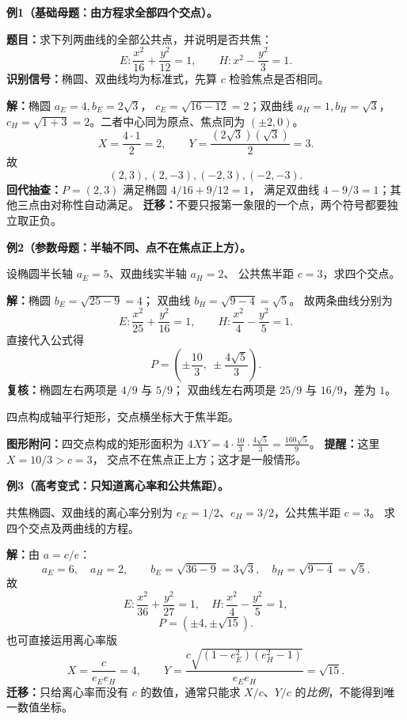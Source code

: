 \clearpage
\begin{examplebox}
\textbf{例1（基础母题：由方程求全部四个交点）。}

\textbf{题目：}求下列两曲线的全部公共点，并说明是否共焦：
\[
E:\frac{x^2}{16}+\frac{y^2}{12}=1,
\qquad H:x^2-\frac{y^2}{3}=1.
\]
\textbf{识别信号：}椭圆、双曲线均为标准式，先算 $c$ 检验焦点是否相同。

\textbf{解：}椭圆 $a_E=4,b_E=2\sqrt3$，
$c_E=\sqrt{16-12}=2$；双曲线 $a_H=1,b_H=\sqrt3$，
$c_H=\sqrt{1+3}=2$。二者中心同为原点、焦点同为 $(\pm2,0)$。
\[
X=\frac{4\cdot1}{2}=2,\qquad
Y=\frac{(2\sqrt3)(\sqrt3)}2=3.
\]
故
\[
\boxed{(2,3),(2,-3),(-2,3),(-2,-3)}.
\]
\textbf{回代抽查：}$P=(2,3)$ 满足椭圆 $4/16+9/12=1$，
满足双曲线 $4-9/3=1$；其他三点由对称性自动满足。
\textbf{迁移：}不要只报第一象限的一个点，两个符号都要独立取正负。
\end{examplebox}

\clearpage
\begin{examplebox}
\textbf{例2（参数母题：半轴不同、点不在焦点正上方）。}

设椭圆半长轴 $a_E=5$、双曲线实半轴 $a_H=2$、
公共焦半距 $c=3$，求四个交点。

\textbf{解：}椭圆 $b_E=\sqrt{25-9}=4$；
双曲线 $b_H=\sqrt{9-4}=\sqrt5$。
故两条曲线分别为
\[
E:\frac{x^2}{25}+\frac{y^2}{16}=1,
\qquad H:\frac{x^2}{4}-\frac{y^2}{5}=1.
\]
直接代入公式得
\[
\boxed{P=\left(\pm\frac{10}{3},\ \pm\frac{4\sqrt5}{3}\right)}.
\]
\textbf{复核：}椭圆左右两项是 $4/9$ 与 $5/9$；
双曲线左右两项是 $25/9$ 与 $16/9$，差为 $1$。
\begin{center}


{\small 四点构成轴平行矩形，交点横坐标大于焦半距。}
\end{center}
\textbf{图形附问：}四交点构成的矩形面积为
$4XY=4\cdot\frac{10}{3}\cdot\frac{4\sqrt5}{3}=\frac{160\sqrt5}{9}$。
\textbf{提醒：}这里 $X=10/3>c=3$，
交点不在焦点正上方；这才是一般情形。
\end{examplebox}

\clearpage
\begin{examplebox}
\textbf{例3（高考变式：只知道离心率和公共焦距）。}

共焦椭圆、双曲线的离心率分别为
$e_E=1/2$、$e_H=3/2$，公共焦半距 $c=3$。
求四个交点及两曲线的方程。

\textbf{解：}由 $a=c/e$：
\[
a_E=6,\quad a_H=2,\qquad
b_E=\sqrt{36-9}=3\sqrt3,\quad b_H=\sqrt{9-4}=\sqrt5.
\]
故
\[
E:\frac{x^2}{36}+\frac{y^2}{27}=1,\quad
H:\frac{x^2}{4}-\frac{y^2}{5}=1,
\]
\[
\boxed{P=(\pm4,\pm\sqrt{15})}.
\]
也可直接运用离心率版
\[
X=\frac{c}{e_Ee_H}=4,\qquad
Y=\frac{c\sqrt{(1-e_E^2)(e_H^2-1)}}{e_Ee_H}
=\sqrt{15}.
\]
\textbf{迁移：}只给离心率而没有 $c$ 的数值，通常只能求
$X/c$、$Y/c$ 的\emph{比例}，不能得到唯一数值坐标。
\end{examplebox}

